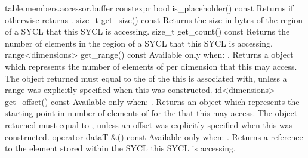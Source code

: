 {table.members.accessor.buffer}
  \addRow
    { constexpr bool is_placeholder() const }
    {
      Returns  if  otherwise returns .
    }
  \addRow
    { size_t get_size() const }
    {
      Returns the size in bytes of the region of a SYCL 
      that this SYCL  is accessing.
    }
  \addRow
    { size_t get_count() const }
    {
      Returns the number of elements in the region of a SYCL 
      that this SYCL  is accessing.
    }
  \addRow
    { range<dimensions> get_range() const }
    {
      Available only when: .
      \newline
      Returns a  object which represents the number of
      elements of  per dimension that this
       may access.
      \newline
      The  object returned must equal to the
       of the  this 
      is associated with, unless a range was explicitly specified when this
       was constructed.
    }
  \addRow
    { id<dimensions> get_offset() const }
    {
      Available only when: .
      \newline
      Returns an  object which represents the starting point in
      number of elements of  for the  that
      this  may access.
      \newline
      The  object returned must equal to
      , unless an offset was explicitly specified
      when this  was constructed.
    }
  \addRow
    { operator dataT \&() const }
    {
      Available only when: .
      \newline
      Returns a reference to the element stored within the SYCL  this SYCL  is accessing.
    }
